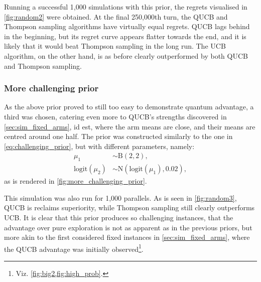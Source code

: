 Running a successful 1,000 simulations with this prior, the regrets visualised in \cref{fig:random2} were obtained.
At the final 250,000th turn, the QUCB and Thompson sampling algorithms have virtually equal regrets.
QUCB lags behind in the beginning, but its regret curve appears flatter towards the end, and it is likely that it would beat Thompson sampling in the long run.
The UCB algorithm, on the other hand, is as before clearly outperformed by both QUCB and Thompson sampling.

\subsubsection{More challenging prior}
As the above prior proved to still too easy to demonstrate quantum advantage, a third was chosen, catering even more to QUCB's strengths discovered in \cref{sec:sim_fixed_arms}, id est, where the arm means are close, and their means are centred around one half.
The prior was constructed similarly to the one in \cref{eq:challenging_prior}, but with different parameters, namely:
\begin{equation}
    \label{eq:more_challenging_prior}
    \begin{aligned}
        \mu_1               & \sim \text{B}(2, 2),                      \\
        \text{logit}(\mu_2) & \sim \text{N}(\text{logit}(\mu_1), 0.02),
    \end{aligned}
\end{equation}
as is rendered in \cref{fig:more_challenging_prior}.

This simulation was also run for 1,000 parallels.
As is seen in \cref{fig:random3}, QUCB is reclaims superiority, while Thompson sampling still clearly outperforms UCB.
It is clear that this prior produces so challenging instances, that the advantage over pure exploration is not as apparent as in the previous priors, but more akin to the first considered fixed instances in \cref{sec:sim_fixed_arms}, where the QUCB advantage was initially observed\footnote{Viz. \cref{fig:big2,fig:high_prob}.}.


